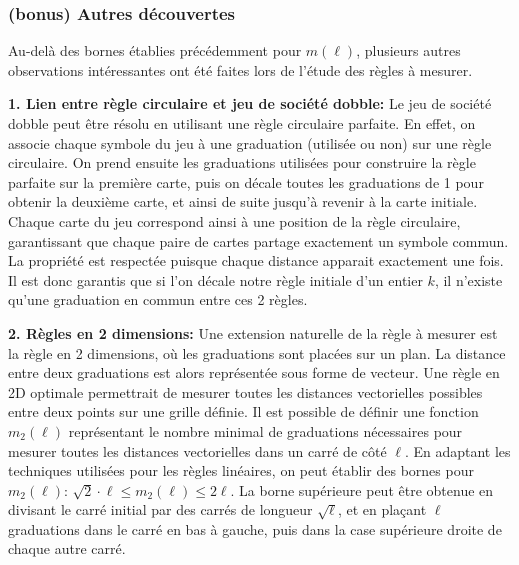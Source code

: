 \subsubsection*{(bonus) Autres découvertes}

Au-delà des bornes établies précédemment pour $m(\ell)$, plusieurs autres observations intéressantes ont été faites lors de l'étude des règles à mesurer.

\vspace{1\baselineskip}

\textbf{1. Lien entre règle circulaire et jeu de société dobble:} Le jeu de société dobble peut être résolu en utilisant une règle circulaire parfaite. En effet, on associe chaque symbole du jeu à une graduation (utilisée ou non) sur une règle circulaire. On prend ensuite les graduations utilisées pour construire la règle parfaite sur la première carte, puis on décale toutes les graduations de 1 pour obtenir la deuxième carte, et ainsi de suite jusqu'à revenir à la carte initiale. Chaque carte du jeu correspond ainsi à une position de la règle circulaire, garantissant que chaque paire de cartes partage exactement un symbole commun. La propriété est respectée puisque chaque distance apparait exactement une fois. Il est donc garantis que si l'on décale notre règle initiale d'un entier $k$, il n'existe qu'une graduation en commun entre ces 2 règles.

\vspace{1\baselineskip}

\textbf{2. Règles en 2 dimensions:} Une extension naturelle de la règle à mesurer est la règle en 2 dimensions, où les graduations sont placées sur un plan. La distance entre deux graduations est alors représentée sous forme de vecteur. Une règle en 2D optimale permettrait de mesurer toutes les distances vectorielles possibles entre deux points sur une grille définie. Il est possible de définir une fonction $m_2(\ell)$ représentant le nombre minimal de graduations nécessaires pour mesurer toutes les distances vectorielles dans un carré de côté $\ell$. En adaptant les techniques utilisées pour les règles linéaires, on peut établir des bornes pour $m_2(\ell)$: $\sqrt{2} \cdot \ell \leq m_2(\ell) \leq 2\ell$. La borne supérieure peut être obtenue en divisant le carré initial par des carrés de longueur $\sqrt{\ell}$, et en plaçant $\ell$ graduations dans le carré en bas à gauche, puis dans la case supérieure droite de chaque autre carré.